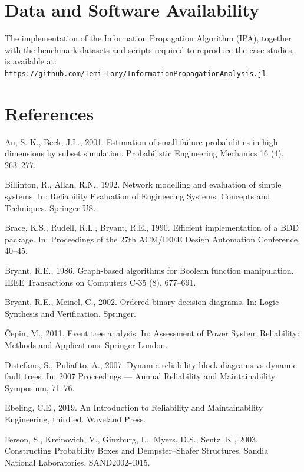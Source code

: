 \documentclass[preprint,12pt]{elsarticle}
\theoremstyle{definition}
\begin{document}
\section*{Data and Software Availability}
The implementation of the Information Propagation Algorithm (IPA), together with the benchmark datasets
and scripts required to reproduce the case studies, is available at:\\
\texttt{https://github.com/Temi-Tory/InformationPropagationAnalysis.jl}.

\section*{References}
\begingroup
\setlength{\parindent}{-1.5em}\setlength{\leftskip}{1.5em}\small

Au, S.-K., Beck, J.L., 2001. Estimation of small failure probabilities in high dimensions by subset
simulation. Probabilistic Engineering Mechanics 16 (4), 263--277.

Billinton, R., Allan, R.N., 1992. Network modelling and evaluation of simple systems. In: Reliability
Evaluation of Engineering Systems: Concepts and Techniques. Springer US.

Brace, K.S., Rudell, R.L., Bryant, R.E., 1990. Efficient implementation of a BDD package. In:
Proceedings of the 27th ACM/IEEE Design Automation Conference, 40--45.

Bryant, R.E., 1986. Graph-based algorithms for Boolean function manipulation. IEEE Transactions on
Computers C-35 (8), 677--691.

Bryant, R.E., Meinel, C., 2002. Ordered binary decision diagrams. In: Logic Synthesis and Verification.
Springer.

\v{C}epin, M., 2011. Event tree analysis. In: Assessment of Power System Reliability: Methods and
Applications. Springer London.

Distefano, S., Puliafito, A., 2007. Dynamic reliability block diagrams vs dynamic fault trees. In: 2007
Proceedings --- Annual Reliability and Maintainability Symposium, 71--76.

Ebeling, C.E., 2019. An Introduction to Reliability and Maintainability Engineering, third ed. Waveland
Press.

Ferson, S., Kreinovich, V., Ginzburg, L., Myers, D.S., Sentz, K., 2003. Constructing Probability Boxes
and Dempster--Shafer Structures. Sandia National Laboratories, SAND2002-4015.
\end{document}
